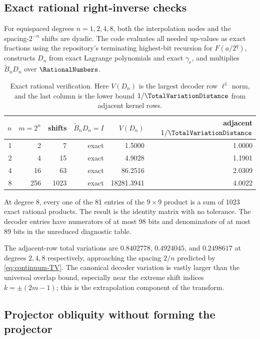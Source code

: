 \documentclass[11pt,oneside]{article}
\numberwithin{equation}{section}
\theoremstyle{definition}
\theoremstyle{remark}
\begin{document}
\subsection{Exact rational right-inverse checks}

For equispaced degrees $n=1,2,4,8$, both the interpolation nodes and the
spacing-$2^{-n}$ shifts are dyadic.  The code evaluates all needed up-values
as exact fractions using the repository's terminating highest-bit recursion
for $F(a/2^q)$, constructs $D_n$ from exact Lagrange polynomials and exact
$\gamma_r$, and multiplies $\widetilde B_nD_n$ over $\RationalNumbers$.

\begin{table}[htbp]
\centering
\caption{Exact rational verification.  Here $V(D_n)$ is the largest decoder
row $\ell^1$ norm, and the last column is the lower bound
$1/\TotalVariationDistance$ from adjacent kernel rows.}
\label{tab:exact-checks}
\begin{tabular}{rrrrrr}
\toprule
$n$ & $m=2^n$ & shifts & $\widetilde B_nD_n=I$ & $V(D_n)$ & adjacent $1/\TotalVariationDistance$ \\
\midrule
1 & 2   & 7    & exact & 1.5000       & 1.0000 \\
2 & 4   & 15   & exact & 4.9028       & 1.1901 \\
4 & 16  & 63   & exact & 86.2516      & 2.0309 \\
8 & 256 & 1023 & exact & 18281.3941   & 4.0022 \\
\bottomrule
\end{tabular}
\end{table}

At degree $8$, every one of the 81 entries of the $9\times9$ product is a
sum of 1023 exact rational products.  The result is the identity matrix with
no tolerance.  The decoder entries have numerators of at most 98 bits and
denominators of at most 89 bits in the unreduced diagnostic table.

The adjacent-row total variations are
$0.8402778$, $0.4924045$, and $0.2498617$ at degrees $2,4,8$ respectively,
approaching the spacing $2/n$ predicted by \eqref{eq:continuum-TV}.  The
canonical decoder variation is vastly larger than the universal overlap
bound, especially near the extreme shift indices $k=\pm(2m-1)$; this is the
extrapolation component of the transform.

\subsection{Projector obliquity without forming the projector}
\end{document}
